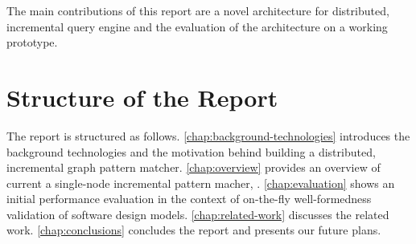 The main contributions of this report are a novel architecture for distributed, incremental query engine and the evaluation of the architecture on a working prototype. 

\section{Structure of the Report}
 
The report is structured as follows. 
\autoref{chap:background-technologies} introduces the background technologies and the motivation behind building a distributed, incremental graph pattern matcher. \autoref{chap:overview} provides an overview of current a single-node incremental pattern macher, \eiq{}. 
\autoref{chap:evaluation} shows an initial performance evaluation in the context of on-the-fly well-formedness validation of software design models. 
\autoref{chap:related-work} discusses the related work. \autoref{chap:conclusions} concludes the report and presents our future plans. 

